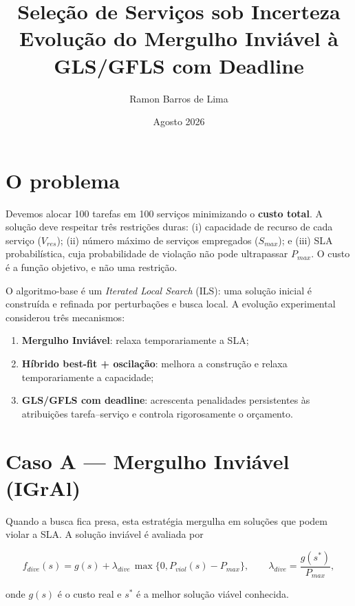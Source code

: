 \documentclass{article}
\title{Seleção de Serviços sob Incerteza\\
Evolução do Mergulho Inviável à GLS/GFLS com Deadline}
\author{Ramon Barros de Lima}
\date{Agosto 2026}
\begin{document}
\maketitle

\section{O problema}

Devemos alocar 100 tarefas em 100 serviços minimizando o \textbf{custo total}.
A solução deve respeitar três restrições duras: (i) capacidade de recurso de
cada serviço ($V_{res}$); (ii) número máximo de serviços empregados
($S_{max}$); e (iii) SLA probabilística, cuja probabilidade de violação não
pode ultrapassar $P_{max}$. O custo é a função objetivo, e não uma restrição.

O algoritmo-base é um \textit{Iterated Local Search} (ILS): uma solução inicial
é construída e refinada por perturbações e busca local. A evolução experimental
considerou três mecanismos:

\begin{enumerate}
    \item \textbf{Mergulho Inviável}: relaxa temporariamente a SLA;
    \item \textbf{Híbrido best-fit + oscilação}: melhora a construção e relaxa
          temporariamente a capacidade;
    \item \textbf{GLS/GFLS com deadline}: acrescenta penalidades persistentes
          às atribuições tarefa--serviço e controla rigorosamente o orçamento.
\end{enumerate}

\section{Caso A --- Mergulho Inviável (IGrAl)}

Quando a busca fica presa, esta estratégia mergulha em soluções que podem
violar a SLA. A solução inviável é avaliada por

\begin{equation}
    f_{dive}(s) = g(s) + \lambda_{dive}\,
    \max\{0, P_{viol}(s)-P_{max}\},
    \qquad
    \lambda_{dive}=\frac{g(s^*)}{P_{max}},
\end{equation}

onde $g(s)$ é o custo real e $s^*$ é a melhor solução viável conhecida.
\end{document}
